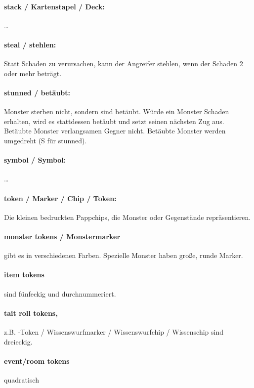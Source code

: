 \paragraph{stack / Kartenstapel / Deck:} …

\paragraph{steal / stehlen:} Statt Schaden zu verursachen, kann der Angreifer stehlen, wenn der Schaden 2 oder mehr beträgt.

\paragraph{stunned / betäubt:} Monster sterben nicht, sondern sind betäubt. Würde ein Monster Schaden erhalten, wird es stattdessen betäubt und setzt seinen nächsten Zug aus. Betäubte Monster verlangsamen Gegner nicht. Betäubte Monster werden umgedreht (S für stunned).

\paragraph{symbol / Symbol:} …

\paragraph{token / Marker / Chip / Token:} Die kleinen bedruckten Pappchips, die Monster oder Gegenstände repräsentieren.

\paragraph{monster tokens / Monstermarker} gibt es in verschiedenen Farben. Spezielle Monster haben große, runde Marker.
\paragraph{item tokens} sind fünfeckig und durchnummeriert.
\paragraph{tait roll tokens,} z.B. \knowroll-Token / Wissenswurfmarker / Wissenswurfchip / Wissenschip sind dreieckig.
\paragraph{event/room tokens} quadratisch

